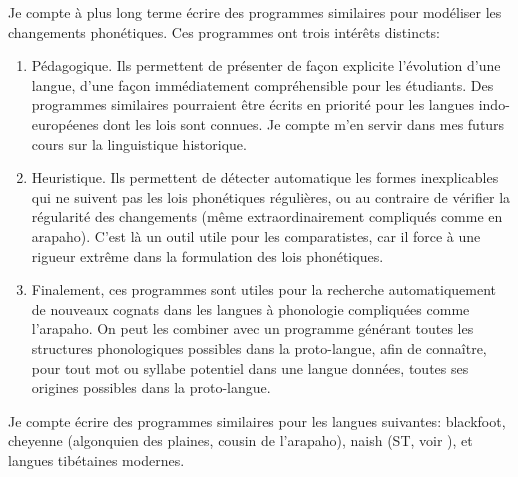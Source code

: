\documentclass[oldfontcommands,oneside,a4paper,11pt]{memoir}
\begin{document}
Je compte à plus long terme écrire des programmes similaires pour modéliser les changements phonétiques. Ces programmes ont trois intérêts distincts:

\begin{enumerate} 
\item Pédagogique. Ils permettent de présenter de façon explicite l'évolution d'une langue, d'une façon immédiatement compréhensible pour les étudiants. Des programmes similaires pourraient être écrits en priorité pour les langues indo-européenes dont les lois sont connues. Je compte m'en servir dans mes futurs cours sur la linguistique historique.
 
\item Heuristique. Ils permettent de détecter automatique les formes inexplicables qui ne suivent pas les lois phonétiques régulières, ou au contraire de vérifier la régularité des changements (même extraordinairement compliqués comme en arapaho). C'est là un outil utile pour les comparatistes, car il force à une rigueur extrême dans la formulation des lois phonétiques.
 
\item Finalement, ces programmes sont utiles pour la recherche automatiquement de nouveaux cognats dans les langues à phonologie compliquées comme l'arapaho. On peut les combiner avec un programme générant toutes les structures phonologiques possibles dans la proto-langue, afin de connaître, pour tout mot ou syllabe potentiel dans une langue données, toutes ses origines possibles dans la proto-langue.
\end{enumerate}


Je compte écrire des programmes similaires pour les langues suivantes: blackfoot, cheyenne (algonquien des plaines, cousin de l'arapaho), naish (ST, voir \citet{jacques.michaud11naish}),  et langues tibétaines modernes.
\end{document}
